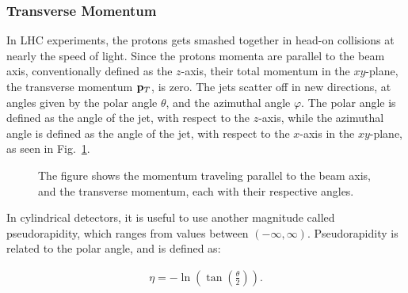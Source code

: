 \documentclass[12pt,a4paper]{article}
\numberwithin{equation}{section}
\begin{document}
\subsubsection{Transverse Momentum}\label{sec:transmomentum}
In LHC experiments, the protons gets smashed together in head-on collisions at
nearly the speed of light. Since the protons momenta are parallel to the beam
axis, conventionally defined as the $z$-axis, their total momentum in the
$xy$-plane, the transverse momentum $\vb p_T$, is zero. The jets scatter off in
new directions, at angles given by the polar angle $\theta$, and the azimuthal angle
$\varphi$. The polar angle is defined as the angle of the jet, with respect to the
$z$-axis, while the azimuthal angle is defined as the angle of the jet, with
respect to the $x$-axis in the $xy$-plane, as seen in Fig.~\ref{fig:momentum}.

\begin{figure}[H]
  \centering
  \caption{The figure shows the momentum traveling parallel to the beam axis, and
  the transverse momentum, each with their respective angles.\label{fig:momentum}}
\end{figure}

In cylindrical detectors, it is useful to use another magnitude called
pseudorapidity, which ranges from values between $(-\infty, \infty)$. Pseudorapidity is
related to the polar angle, and is defined as:

\begin{align}
\label{eq:pseudorapidity}
\eta = -\ln({\tan\left(\frac{\theta}{2}\right)}).
\end{align}
\end{document}
